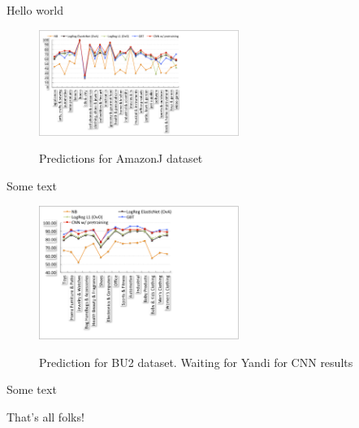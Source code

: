 Hello world



\begin{figure}
\centering
\includegraphics[width=0.58\textwidth]{images/amazonj-WUC-predictions}
\label{Figure_amazonj-WUC-predictions}
\caption{Predictions for AmazonJ dataset}
\end{figure}
Some text

\begin{figure}
\centering
\includegraphics[width=0.58\textwidth]{images/BU2-WUC-predictions}
\label{Figure_BU2-WUC-predictions}
\caption{Prediction for BU2 dataset. Waiting for Yandi for CNN results}
\end{figure}
Some text

That's all folks!
